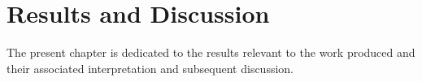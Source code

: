 


\chapter{Results and Discussion}
\label{chapter:results}

The present chapter is dedicated to the results relevant to the work produced and their associated interpretation and subsequent discussion.


%
%

 